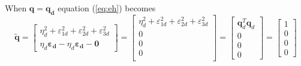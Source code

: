 When $\boldsymbol{q}=\boldsymbol{q_d}$ equation (\ref{eq:eh}) becomes
\begin{equation}
\boldsymbol{\tilde{q}}=
\begin{bmatrix}
\eta^2_d+\varepsilon_{1d}^2+\varepsilon_{2d}^2+\varepsilon_{3d}^2\\
\eta_d\boldsymbol{\varepsilon_{d}}-\eta_d\boldsymbol{\varepsilon_{d}}-\boldsymbol{0}
\end{bmatrix}
=
\begin{bmatrix}
\eta^2_d+\varepsilon_{1d}^2+\varepsilon_{2d}^2+\varepsilon_{3d}^2\\
0\\
0\\
0\\
\end{bmatrix}
=
\begin{bmatrix}
\boldsymbol{q}_d^T\boldsymbol{q}_d \\ 0\\0\\0
\end{bmatrix}
=
\begin{bmatrix}
1\\0\\0\\0
\end{bmatrix}
\end{equation}

